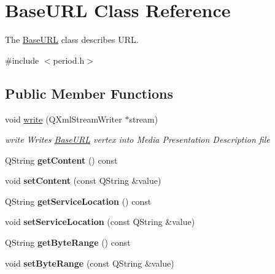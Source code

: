 \hypertarget{class_base_u_r_l}{\section{Base\-U\-R\-L Class Reference}
\label{class_base_u_r_l}
}


The \hyperlink{class_base_u_r_l}{Base\-U\-R\-L} class describes U\-R\-L.  




{\ttfamily \#include $<$period.\-h$>$}

\subsection*{Public Member Functions}
\begin{DoxyCompactItemize}
\item 
void \hyperlink{class_base_u_r_l_add8c1d17fc01a655570c868e46003efd}{write} (Q\-Xml\-Stream\-Writer $\ast$stream)
\begin{DoxyCompactList}\small\item\em write Writes \hyperlink{class_base_u_r_l}{Base\-U\-R\-L} vertex into Media Presentation Description file \end{DoxyCompactList}\item 
\hypertarget{class_base_u_r_l_ad6a11a51adabbf5f0e9cdf84787dd26f}{Q\-String {\bfseries get\-Content} () const }\label{class_base_u_r_l_ad6a11a51adabbf5f0e9cdf84787dd26f}

\item 
\hypertarget{class_base_u_r_l_a666c75d5eb8e1e948e3b92659358abfd}{void {\bfseries set\-Content} (const Q\-String \&value)}\label{class_base_u_r_l_a666c75d5eb8e1e948e3b92659358abfd}

\item 
\hypertarget{class_base_u_r_l_a0f20b8c1d3b03afd0c4ba5ab0fc26024}{Q\-String {\bfseries get\-Service\-Location} () const }\label{class_base_u_r_l_a0f20b8c1d3b03afd0c4ba5ab0fc26024}

\item 
\hypertarget{class_base_u_r_l_a1963c314bf41a6bf97d1adadecf33038}{void {\bfseries set\-Service\-Location} (const Q\-String \&value)}\label{class_base_u_r_l_a1963c314bf41a6bf97d1adadecf33038}

\item 
\hypertarget{class_base_u_r_l_ac246605fe1c4f35b1c73e345844bbb91}{Q\-String {\bfseries get\-Byte\-Range} () const }\label{class_base_u_r_l_ac246605fe1c4f35b1c73e345844bbb91}

\item 
\hypertarget{class_base_u_r_l_af44c979068c618592c73d68cd9d1fc1e}{void {\bfseries set\-Byte\-Range} (const Q\-String \&value)}\label{class_base_u_r_l_af44c979068c618592c73d68cd9d1fc1e}

\end{DoxyCompactItemize}


